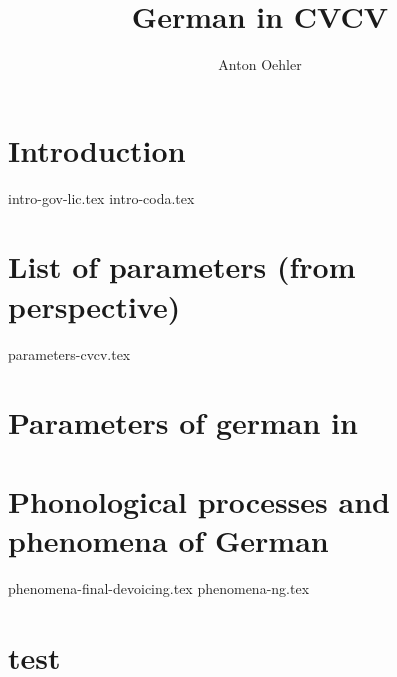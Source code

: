 \documentclass[
]{scrartcl}
\title{German in CVCV}
\author{Anton Oehler}
\begin{document}
\maketitle


\tableofcontents

\section{Introduction}
{intro-gov-lic.tex}
{intro-coda.tex}


\section{List of parameters (from \CVCV perspective)}
{parameters-cvcv.tex}

\section{Parameters of german in \CVCV}

\section{Phonological processes and phenomena of German}
{phenomena-final-devoicing.tex}
{phenomena-ng.tex}

\section{test}
 
\begin{structure}
    \wordstart
    \V{\textschwa}
    \fen

\end{structure}

\begin{structure}
    \wordstart
    \emptyV
    \V[floating]{\textschwa}
    \fen

\end{structure}
\end{document}

